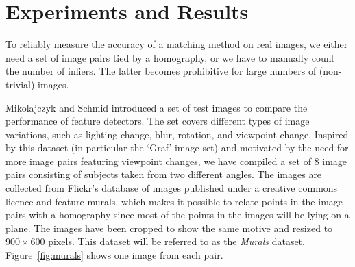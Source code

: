 \chapter{Experiments and Results}
\label{S:Experiments}
%
To reliably measure the accuracy of a matching method on real images, we 
either need a set of image pairs tied by a homography, or we have to 
manually count the number of inliers. The latter becomes prohibitive for 
large numbers of (non-trivial) images. 

Mikolajczyk and Schmid  \cite{mikolajczyk2005performance} introduced a 
set of test images to compare the performance of feature detectors. The 
set covers different types of image variations, such as lighting change, 
blur, rotation, and viewpoint change. Inspired by this dataset (in 
particular the `Graf' image set) and motivated by the need for more 
image pairs featuring viewpoint changes, we have compiled a set of 8 
image pairs consisting of subjects taken from two different angles. The 
images are collected from Flickr's database of images published under a 
creative commons licence and feature murals, which makes it possible to 
relate points in the image pairs with a homography since most of the 
points in the images will be lying on a plane.  The images have been 
cropped to show the same motive and resized to $900\times 600$ pixels.  
This dataset will be referred to as the \emph{Murals} dataset.  
Figure~\ref{fig:murals} shows one image from each pair.

